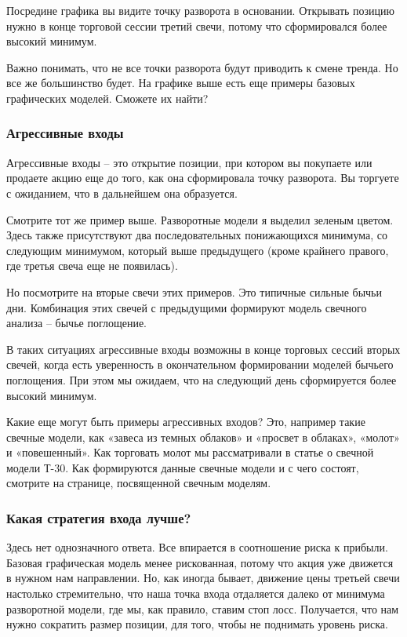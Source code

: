 \documentclass[a5paper]{article}
\begin{document}
Посредине графика вы видите точку разворота в основании. Открывать позицию нужно в конце торговой сессии третий свечи, потому что сформировался более высокий минимум.

Важно понимать, что не все точки разворота будут приводить к смене
тренда. Но все же большинство будет. На графике выше есть еще примеры
базовых графических моделей. Сможете их найти?

\subsubsection{Агрессивные входы}

Агрессивные входы – это открытие позиции, при котором вы покупаете или продаете акцию еще до того, как она сформировала точку разворота. Вы торгуете с ожиданием, что в дальнейшем она образуется.

Смотрите тот же пример выше. Разворотные модели я выделил зеленым цветом. Здесь также присутствуют два последовательных понижающихся минимума, со следующим минимумом, который выше предыдущего (кроме крайнего правого, где третья свеча еще не появилась).

Но посмотрите на вторые свечи этих примеров. Это типичные сильные бычьи дни. Комбинация этих свечей с предыдущими формируют модель свечного анализа – бычье поглощение.

В таких ситуациях агрессивные входы возможны в конце торговых сессий вторых свечей, когда есть уверенность в окончательном формировании моделей бычьего поглощения. При этом мы ожидаем, что на следующий день сформируется более высокий минимум.

Какие еще могут быть примеры агрессивных входов? Это, например такие
свечные модели, как «завеса из темных облаков» и «просвет в облаках»,
«молот» и «повешенный». Как торговать молот мы рассматривали в статье
о свечной модели Т-30. Как формируются данные свечные модели и с чего
состоят, смотрите на странице, посвященной свечным моделям.

\subsubsection{Какая стратегия входа лучше?}

Здесь нет однозначного ответа. Все впирается в соотношение риска к прибыли. Базовая графическая модель менее рискованная, потому что акция уже движется в нужном нам направлении. Но, как иногда бывает, движение цены третьей свечи настолько стремительно, что наша точка входа отдаляется далеко от минимума разворотной модели, где мы, как правило, ставим стоп лосс. Получается, что нам нужно сократить размер позиции, для того, чтобы не поднимать уровень риска.
\end{document}
